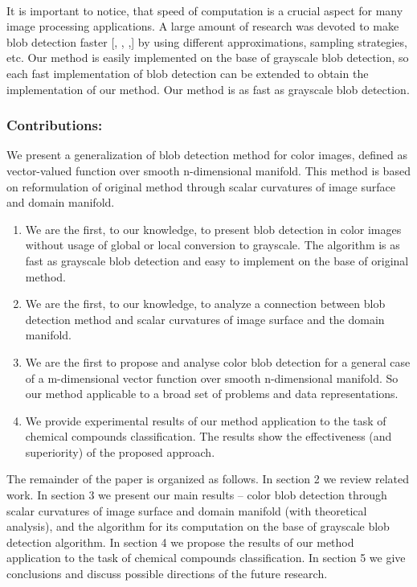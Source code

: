 \documentclass{llncs}
\begin{document}
\\
It is important to notice, that speed of computation is a crucial aspect for many image processing applications. A large amount of research was devoted to make blob detection faster [, , ,] by using different approximations, sampling strategies, etc. Our method is easily implemented on the base of grayscale blob detection, so each fast implementation of blob detection can be extended to obtain the implementation of our method. Our method is as fast as grayscale blob detection.
\subsubsection{Contributions:}
We present a generalization of blob detection method for color images, defined as vector-valued function over smooth n-dimensional manifold. This method is based on reformulation of original method through scalar curvatures of image surface and domain manifold.
\begin{enumerate}
\item We are the first, to our knowledge, to present blob detection in color images without usage of global or local conversion to grayscale. The algorithm is as fast as grayscale blob detection and easy to implement on the base of original method. 
\item We are the first, to our knowledge, to analyze a connection between blob detection method and scalar curvatures of image surface and the domain manifold.
\item We are the first to propose and analyse color blob detection for a general case of a m-dimensional vector function over smooth n-dimensional manifold. So our method applicable to a broad set of problems and data representations. 
\item We provide experimental results of our method application to the task of chemical compounds classification. The results show the effectiveness (and superiority) of the proposed approach.  
\end{enumerate}

The remainder of the paper is organized as follows. In section 2 we review related work. In section 3 we present our main results – color blob detection through scalar curvatures of image surface and domain manifold (with theoretical analysis), and the algorithm for its computation on the base of grayscale blob detection algorithm. In section 4 we propose the results of our method application to the task of chemical compounds classification. In section 5 we give conclusions and discuss possible directions of the future research.
\end{document}
